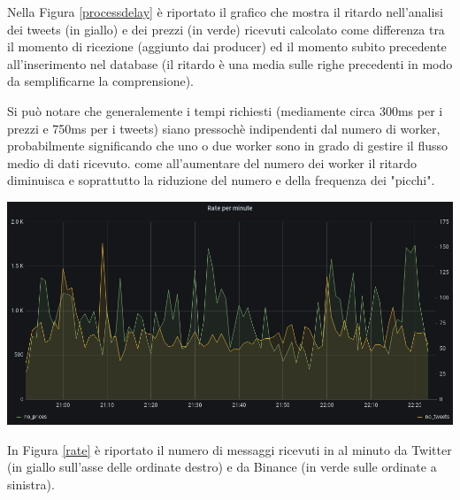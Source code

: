 Nella Figura \ref{processdelay} è riportato il grafico che mostra il ritardo nell'analisi dei tweets
(in giallo) e dei prezzi (in verde) ricevuti calcolato come differenza tra il momento di ricezione
(aggiunto dai producer) ed il momento subito precedente all'inserimento nel database (il ritardo è
una media sulle righe precedenti in modo da semplificarne la comprensione).

Si può notare che generalemente i tempi richiesti (mediamente circa 300ms per i prezzi e 750ms per
i tweets) siano pressochè indipendenti dal numero di worker,
probabilmente significando che uno o due worker sono in grado di gestire il flusso medio di dati
ricevuto.
come all'aumentare del numero dei worker il ritardo diminuisca e soprattutto la
riduzione del numero e della frequenza dei "picchi".

\begin{center}
    \includegraphics[max width=\linewidth]{rate.png}
    \label{rate}
\end{center}

In Figura \ref{rate} è riportato il numero di messaggi ricevuti in al minuto da Twitter (in giallo
sull'asse delle ordinate destro) e da Binance (in verde sulle ordinate a sinistra).

